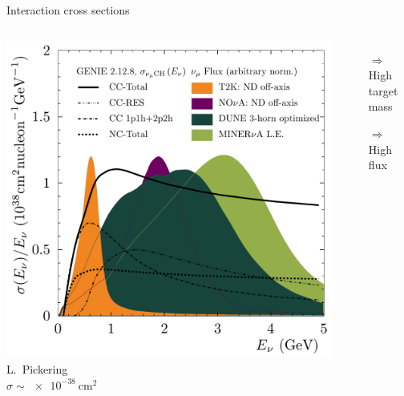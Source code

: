 \documentclass[]{beamer}
\newcommand*{\emphcol}{blue}
\begin{document}
\begin{frame}{Interaction cross sections}
	\begin{columns}[c]
		\centering
		\includegraphics[width=\textwidth]{nu-detection/flux_and_xsec_from_luke}\\
		{\tiny L.\ Pickering}\\
		{\color{\emphcol} $\sigma \sim \SI{e-38}{\centi\metre\squared}$}
		\begin{itemize}
			\item[$\Rightarrow$] High target mass
			\item[$\Rightarrow$] High flux
		\end{itemize}
	\end{columns}
\end{frame}
\end{document}

